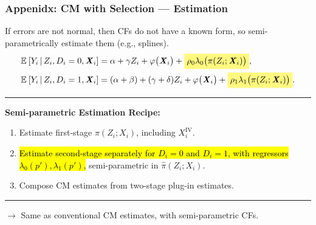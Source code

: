 \documentclass[dvipsnames]{beamer} %
\makeatletter
\renewcommand{\vec}[1]{\boldsymbol{\mathit{#1}}}                           %
\newcommand{\E}[2][]{\mathbb{E}_{#1} \left[ #2 \right]}                    %
\newcommand{\Egiven}[3][]{\mathbb{E}_{#1} \left[ #2 \, \middle\vert \, #3 \right]} %
\renewcommand{\hat}[1]{\widehat{#1}}                                       %
\renewcommand{\bar}[1]{\overline{#1}}                                      %
\newcommand{\eqhighlight}[2]{\colorbox{#1!50}{$\displaystyle#2$}}
\let\HL\hl
\renewcommand\hl{%
    \let\set@color\beamerorig@set@color
    \let\reset@color\beamerorig@reset@color
    \HL}
\makeatother
\begin{document}
\begin{frame}[noframenumbering]
    \frametitle{Appenidx: CM with Selection --- Estimation}
    If errors are not normal, then CFs do not have a known form, so semi-parametrically estimate them (e.g., splines).
    \begin{align*}
        \Egiven{Y_i}{Z_i, D_i = 0, \vec X_i} &=
            \alpha + \gamma Z_i + \varphi\big( \vec X_i \big)
            + \eqhighlight{yellow}{\rho_0 \lambda_0 \big( \pi(Z_i ; \vec X_i) \big)}, \\
        \Egiven{Y_i}{Z_i, D_i = 1, \vec X_i} &=
            (\alpha + \beta) + (\gamma + \delta) Z_i + \varphi\big( \vec X_i\big)
            + \eqhighlight{yellow}{\rho_1 \lambda_1 \big( \pi(Z_i ; \vec X_i) \big)}.
    \end{align*}

    \par\noindent\rule{\textwidth}{0.4pt}
    \textbf{Semi-parametric Estimation Recipe:}
    \begin{enumerate}
        \item Estimate first-stage $\pi(Z_i; \vec X_i)$, including $\vec X_i^{\text{IV}}$.
        \item \hl{Estimate second-stage separately for $D_i = 0$ and $D_i = 1$, with regressors $\lambda_0(p'), \lambda_1(p')$,} semi-parametric in $\hat\pi(Z_i; \vec X_i)$.
        \item Compose CM estimates from two-stage plug-in estimates. 
    \end{enumerate}
    \vfill

    \par\noindent\rule{\textwidth}{0.4pt}
    $\to$ Same as conventional CM estimates, with semi-parametric CFs.
    \hyperlink{cf-semiparametric}{}
    
    \vskip0.125cm
    \makebox[\textwidth]{\parbox{1.25\textwidth}{
        \small
        \[ \hat{\text{ADE}}
            = \E{\hat\gamma + \hat\delta D_i}, \;\;
        \hat{\text{AIE}}
            = \mathbb E \Bigg[ \, \hat{\bar \pi} \,
                \Big( \hat\beta +  \hat\delta Z_i +
                    (\hat\rho_1 - \hat\rho_0) \,
                    \Gamma \big(\hat\pi(0; \vec X_i), \, \hat\pi(1; \vec X_i) \big)\Big) \Bigg] \]
    }}
\end{frame}%
\end{document}
